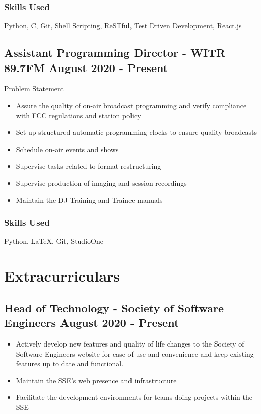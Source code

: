 \documentclass[11pt, letterpaper]{article}
\begin{document}
            \subsubsection{Skills Used}
                Python, C, Git, Shell Scripting, ReSTful, Test Driven Development, React.js
        \subsection{Assistant Programming Director - WITR 89.7FM \hfill August 2020 - Present}
            Problem Statement
            \begin{itemize}[nosep]
                \item Assure the quality of on-air broadcast programming and verify compliance with FCC
                regulations and station policy
                \item Set up structured automatic programming clocks to ensure quality broadcasts
                \item Schedule on-air events and shows
                \item Supervise tasks related to format restructuring
                \item Supervise production of imaging and session recordings
                \item Maintain the DJ Training and Trainee manuals
            \end{itemize}
            \subsubsection{Skills Used}
                Python, LaTeX, Git, StudioOne

    \section{Extracurriculars}
        \subsection{Head of Technology - Society of Software Engineers \hfill August 2020 - Present}
            \begin{itemize}[nosep]
                \item Actively develop new features and quality of life changes to the Society 
                of Software Engineers website for ease-of-use and convenience and keep existing
                features up to date and functional.
                \item Maintain the SSE’s web presence and infrastructure
                \item Facilitate the development environments for teams doing projects within the SSE
            \end{itemize}
\end{document}
